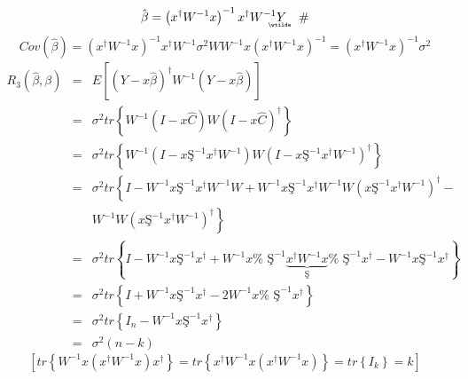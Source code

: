 \documentclass{article}
\begin{document}
\begin{equation*}
\therefore \hat{\beta}=\left( x^{\dagger }W^{-1}x\right) ^{-1}x^{\dagger
}W^{-1}%
\underaccent{\wtilde}{Y}%
\quad \#
\end{equation*}%
\begin{equation*}
Cov\left( \hat{\beta}\right) =\left( x^{\dagger }W^{-1}x\right)
^{-1}x^{\dagger }W^{-1}\sigma ^{2}WW^{-1}x\left( x^{\dagger }W^{-1}x\right)
^{-1}=\left( x^{\dagger }W^{-1}x\right) ^{-1}\sigma ^{2}
\end{equation*}%
\begin{eqnarray*}
R_{3}\left( \hat{\beta},\beta \right) &=&E\left[ \left( Y-x\hat{\beta}%
\right) ^{\dagger }W^{-1}\left( Y-x\hat{\beta}\right) \right] \\
&=&\sigma ^{2}tr\left\{ W^{-1}\left( I-x\hat{C}\right) W\left( I-x\hat{C}%
\right) ^{\dagger }\right\} \\
&=&\sigma ^{2}tr\left\{ W^{-1}\left( I-x\text{\c{S}}^{-1}x^{\dagger
}W^{-1}\right) W\left( I-x\text{\c{S}}^{-1}x^{\dagger }W^{-1}\right)
^{\dagger }\right\} \\
&=&\sigma ^{2}tr\left\{ I-W^{-1}x\text{\c{S}}^{-1}x^{\dagger }W^{-1}W+W^{-1}x%
\text{\c{S}}^{-1}x^{\dagger }W^{-1}W\left( x\text{\c{S}}^{-1}x^{\dagger
}W^{-1}\right) ^{\dagger }-\right. \\
&&\left. W^{-1}W\left( x\text{\c{S}}^{-1}x^{\dagger }W^{-1}\right) ^{\dagger
}\right\} \\
&=&\sigma ^{2}tr\left\{ I-W^{-1}x\text{\c{S}}^{-1}x^{\dagger }+W^{-1}x\text{%
\c{S}}^{-1}\underset{\text{\c{S}}}{\underbrace{x^{\dagger }W^{-1}x}}\text{%
\c{S}}^{-1}x^{\dagger }-W^{-1}x\text{\c{S}}^{-1}x^{\dagger }\right\} \\
&=&\sigma ^{2}tr\left\{ I+W^{-1}x\text{\c{S}}^{-1}x^{\dagger }-2W^{-1}x\text{%
\c{S}}^{-1}x^{\dagger }\right\} \\
&=&\sigma ^{2}tr\left\{ I_{n}-W^{-1}x\text{\c{S}}^{-1}x^{\dagger }\right\} \\
&=&\sigma ^{2}\left( n-k\right)
\end{eqnarray*}%
\begin{equation*}
\left[ tr\left\{ W^{-1}x\left( x^{\dagger }W^{-1}x\right) x^{\dagger
}\right\} =tr\left\{ x^{\dagger }W^{-1}x\left( x^{\dagger }W^{-1}x\right)
\right\} =tr\left\{ I_{k}\right\} =k\right]
\end{equation*}

\bigskip

\bigskip
\end{document}
